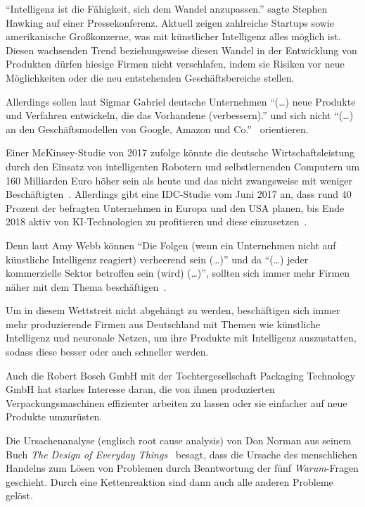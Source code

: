 \enquote{Intelligenz ist die Fähigkeit, sich dem Wandel anzupassen.} sagte Stephen Hawking auf einer Pressekonferenz.
Aktuell zeigen zahlreiche Startups sowie amerikanische Großkonzerne, was mit künstlicher Intelligenz alles möglich ist.
Diesen wachsenden Trend beziehungsweise diesen Wandel in der Entwicklung von Produkten dürfen hiesige Firmen nicht
verschlafen, indem sie Risiken vor neue Möglichkeiten oder die neu entstehenden Geschäftsbereiche stellen.

Allerdings sollen laut Sigmar Gabriel deutsche Unternehmen \enquote{(\ldots) neue Produkte und Verfahren
entwickeln, die das Vorhandene (verbessern).} und sich nicht \enquote{(\ldots) an den Geschäftsmodellen von Google,
Amazon und Co.}~\cite{article_einleitung_ww_sg} orientieren.

Einer McKinsey-Studie von 2017 zufolge könnte die deutsche Wirtschaftsleistung durch den Einsatz von intelligenten
Robotern und selbstlernenden Computern um 160 Milliarden Euro höher sein als heute und das nicht zwangsweise mit weniger
Beschäftigten~\cite{online_einleitung_mckinsey}. Allerdings gibt eine IDC-Studie vom Juni 2017 an, dass rund 40 Prozent
der befragten Unternehmen in Europa und den USA planen, bis Ende 2018 aktiv von KI-Technologien zu profitieren und diese
einzusetzen~\cite{article_grundlagen_salesforce}.

Denn laut Amy Webb können \enquote{Die Folgen (wenn ein Unternehmen nicht auf künstliche Intelligenz reagiert)
verheerend sein (\ldots)} und da \enquote{(\ldots) jeder kommerzielle Sektor betroffen sein (wird) (\ldots)}, sollten
sich immer mehr Firmen näher mit dem Thema beschäftigen~\cite{article_einleitung_dub_aw}.

Um in diesem Wettstreit nicht abgehängt zu werden, beschäftigen sich immer mehr produzierende Firmen aus Deutschland mit
Themen wie künstliche Intelligenz und neuronale Netzen, um ihre Produkte mit Intelligenz auszustatten, sodass diese
besser oder auch schneller werden.

Auch die Robert Bosch GmbH mit der Tochtergesellschaft Packaging Technology GmbH hat starkes Interesse daran, die von
ihnen produzierten Verpackungsmaschinen effizienter arbeiten zu lassen oder sie einfacher auf neue Produkte umzurüsten.

Die Ursachenanalyse (englisch root cause analysis) von Don Norman aus seinem Buch \textit{The Design of Everyday
Things}~\cite{book_einleitung_donnorman} besagt, dass die Ursache des menschlichen Handelns zum Lösen von Problemen
durch Beantwortung der fünf \textit{Warum}-Fragen geschieht. Durch eine Kettenreaktion sind dann auch alle anderen
Probleme gelöst.

